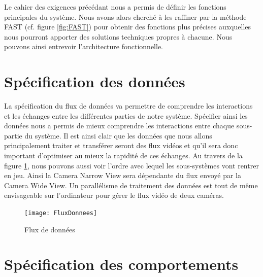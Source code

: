 Le cahier des exigences précédant nous a permis de définir les fonctions principales du système. Nous avons alors cherché à les raffiner par la méthode FAST (cf. figure \ref{fig:FAST}) pour obtenir des fonctions plus précises auxquelles nous pourront apporter des solutions techniques propres à chacune. Nous pouvons ainsi entrevoir l'architecture fonctionnelle.

\section{Spécification des données}

La spécification du flux de données va permettre de comprendre les interactions et les échanges entre les différentes parties de notre système. Spécifier ainsi les données nous a permis de mieux comprendre les interactions entre chaque sous-partie du système. Il est ainsi clair que les données que nous allons principalement traiter et transférer seront des flux vidéos et qu’il sera donc important d’optimiser au mieux la rapidité de ces échanges.
Au travers de la figure \ref{fig:fluxDonnees}, nous pouvons aussi voir l’ordre avec lequel les sous-systèmes vont rentrer en jeu. Ainsi la Camera Narrow View sera dépendante du flux envoyé par la Camera Wide View. Un parallélisme de traitement des données est tout de même envisageable sur l'ordinateur pour gérer le flux vidéo de deux caméras.

\begin{figure}[h]
  \centering
  \texttt{[image: FluxDonnees]}
  \caption{Flux de données}
  \label{fig:fluxDonnees}
\end{figure}

\section{Spécification des comportements}

